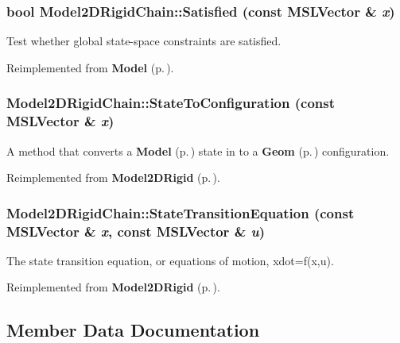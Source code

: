 \subsubsection{\setlength{\rightskip}{0pt plus 5cm}bool Model2DRigid\-Chain::Satisfied (const {\bf MSLVector} \& {\em x})\hspace{0.3cm}{\tt  [virtual]}}\label{classModel2DRigidChain_a6}


Test whether global state-space constraints are satisfied.



Reimplemented from {\bf Model} {\rm (p.\,\pageref{classModel_a4})}.
\subsubsection{ Model2DRigid\-Chain::State\-To\-Configuration (const {\bf MSLVector} \& {\em x})\hspace{0.3cm}{\tt  [virtual]}}\label{classModel2DRigidChain_a2}


A method that converts a {\bf Model} {\rm (p.\,\pageref{classModel})} state in to a {\bf Geom} {\rm (p.\,\pageref{classGeom})} configuration.



Reimplemented from {\bf Model2DRigid} {\rm (p.\,\pageref{classModel2DRigid_a6})}.
\subsubsection{ Model2DRigid\-Chain::State\-Transition\-Equation (const {\bf MSLVector} \& {\em x}, const {\bf MSLVector} \& {\em u})\hspace{0.3cm}{\tt  [virtual]}}\label{classModel2DRigidChain_a3}


The state transition equation, or equations of motion, xdot=f(x,u).



Reimplemented from {\bf Model2DRigid} {\rm (p.\,\pageref{classModel2DRigid_a3})}.

\subsection{Member Data Documentation}
